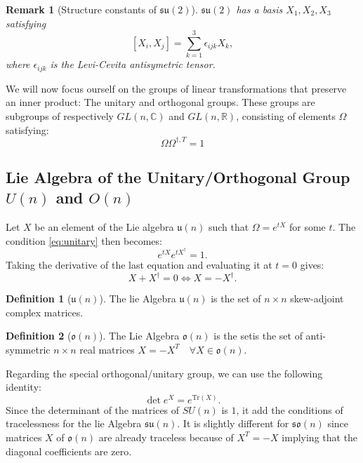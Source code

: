 \documentclass[11pt,a4paper]{article}
\newtheorem*{remark}{Remark}
\theoremstyle{definition}
\newtheorem{definition}{Definition}[section]
\numberwithin{equation}{section}
\begin{document}
\begin{remark}[Structure constants of $\mathfrak{su}(2)$]
    $\mathfrak{su}(2)$ has a basis $X_1,X_2,X_3$ satisfying
    \begin{equation*}
        \left[X_i,X_j\right] = \sum_{k=1}^{3}\epsilon_{ijk}X_k,
    \end{equation*}
    where $\epsilon_{ijk}$ is the Levi-Cevita antisymetric tensor.
\end{remark}
We will now focus ourself on the groups of linear transformations that preserve an inner product: The unitary and orthogonal groups. These groups are subgroups of respectively $GL(n,\mathbb{C})$ and $GL(n,\mathbb{R})$, consisting of elements $\Omega$ satisfying:
\begin{equation}
    \label{eq:unitary}
    \Omega\Omega^{\dagger,T} = 1
\end{equation}
\subsection{Lie Algebra of the Unitary/Orthogonal Group $U(n)$ and $ O(n)$}
Let $X$ be an element of the Lie algebra $\mathfrak{u}(n)$ such that $\Omega = e^{tX}$ for some $t$.
The condition \ref{eq:unitary} then becomes:
\begin{equation*}
    e^{tX}e^{tX^\dagger} = 1.
\end{equation*}
Taking the derivative of the last equation and evaluating it at $t=0$ gives:
\begin{equation*}
    X + X^\dagger = 0 \Leftrightarrow X = -X^\dagger.
\end{equation*}
\begin{definition}[$\mathfrak{u}(n)$]
    The lie Algebra $\mathfrak{u}(n)$ is the set of $n\times n$ skew-adjoint complex matrices.
\end{definition}

\begin{definition}[$\mathfrak{o}(n)$]
    The Lie Algebra $\mathfrak{o}(n)$ is the setis the set of  anti-symmetric $n\times n$ real matrices $X = - X^T \quad \forall X \in \mathfrak{o}(n)$.
\end{definition}
Regarding the special orthogonal/unitary group, we can use the following identity:
\begin{equation*}
    \det e^{X} = e^{\text{Tr}(X)}.
\end{equation*}
Since the determinant of the matrices of $SU(n)$ is $1$, it add the conditions of tracelessness for the lie Algebra  $\mathfrak{su}(n)$. It is slightly different for $\mathfrak{so}(n)$ since matrices $X$ of $\mathfrak{o}(n)$ are already traceless because of $X^T = -X$ implying that the diagonal coefficients are zero.
\end{document}
